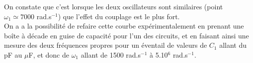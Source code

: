 \documentclass[12pt,prb,aps,epsf]{article}
\begin{document}
On constate que c'est lorsque les deux oscillateurs sont similaires (point $\omega_1\simeq 7000$ rad.s$^{-1}$) que l'effet du couplage est le plus fort.\\

On a a la possibilité de refaire cette courbe expérimentalement en prenant une boîte à décade en guise de capacité pour l'un des circuits, et en faisant ainsi une mesure des deux fréquences propres pour un éventail de valeurs de $C_1$ allant du pF au $\mu$F, et donc de $\omega_1$ allant de 1500 rad.s$^{-1}$ à 5.10$^6$ rad.s$^{-1}$.
\end{document}

